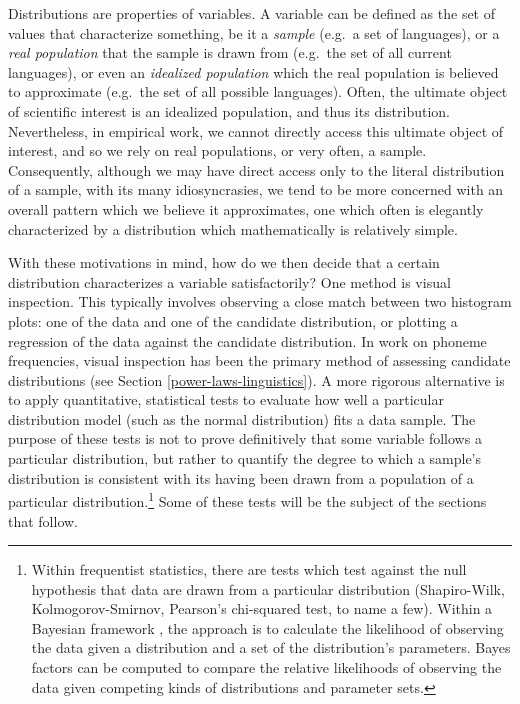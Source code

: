 Distributions are properties of variables. A variable can be defined as the set of values that characterize something, be it a \emph{sample} (e.g.~a set of languages), or a \emph{real population} that the sample is drawn from (e.g.~the set of all current languages), or even an \emph{idealized population} which the real population is believed to approximate (e.g.~the set of all possible languages). Often, the ultimate object of scientific interest is an idealized population, and thus its distribution. Nevertheless, in empirical work, we cannot directly access this ultimate object of interest, and so we rely on real populations, or very often, a sample. Consequently, although we may have direct access only to the literal distribution of a sample, with its many idiosyncrasies, we tend to be more concerned with an overall pattern which we believe it approximates, one which often is elegantly characterized by a distribution which mathematically is relatively simple.

With these motivations in mind, how do we then decide that a certain distribution characterizes a variable satisfactorily? One method is visual inspection. This typically involves observing a close match between two histogram plots: one of the data and one of the candidate distribution, or plotting a regression of the data against the candidate distribution. In work on phoneme frequencies, visual inspection has been the primary method of assessing candidate distributions (see Section \ref{power-laws-linguistics}). A more rigorous alternative is to apply quantitative, statistical tests to evaluate how well a particular distribution model (such as the normal distribution) fits a data sample. The purpose of these tests is not to prove definitively that some variable follows a particular distribution, but rather to quantify the degree to which a sample's distribution is consistent with its having been drawn from a population of a particular distribution.\footnote{Within frequentist statistics, there are tests which test against the null hypothesis that data are drawn from a particular distribution (Shapiro-Wilk, Kolmogorov-Smirnov, Pearson's chi-squared test, to name a few). Within a Bayesian framework \autocites{spiegelhalter_omnibus_1980}{farrell_comprehensive_2006}, the approach is to calculate the likelihood of observing the data given a distribution and a set of the distribution's parameters. Bayes factors can be computed to compare the relative likelihoods of observing the data given competing kinds of distributions and parameter sets.} Some of these tests will be the subject of the sections that follow.

